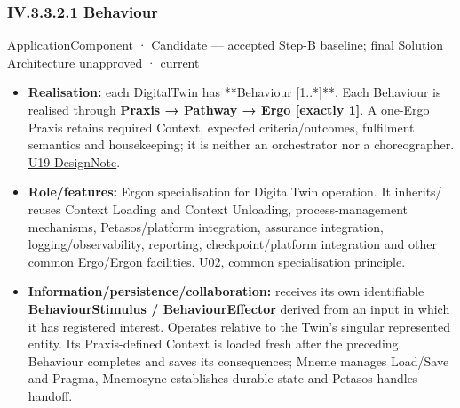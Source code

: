 \subsubsection*{IV.3.3.2.1 Behaviour}
\label{navigation:IV.3.3.2.1}

\label{element:a26f06d66bec4981b266e202c46a9afb}
{\small ApplicationComponent · Candidate — accepted Step-B baseline; final Solution Architecture unapproved · current}\par

\begin{itemize}


\item \textbf{Realisation:} each DigitalTwin has **Behaviour [1..*]**. Each Behaviour is
  realised through \textbf{Praxis → Pathway → Ergo [exactly 1]}. A one-Ergo Praxis
  retains required Context, expected criteria/outcomes, fulfilment semantics and
  housekeeping; it is neither an orchestrator nor a choreographer.
  \href{\detokenize{../../../../../docs/markdown/05-information-systems-architecture/design-notes/DesignNote-Digital-Twin-Behaviour-and-Execution-Semantics.md}}{U19 DesignNote}.

\item \textbf{Role/features:} Ergon specialisation for DigitalTwin operation. It inherits/
  reuses Context Loading and Context Unloading, process-management mechanisms,
  Petasos/platform integration, assurance integration, logging/observability,
  reporting, checkpoint/platform integration and other common Ergo/Ergon facilities.
  \href{\detokenize{../../../../../docs/markdown/05-information-systems-architecture/sources.md#u02}}{U02}, \href{\detokenize{../../../../../docs/markdown/05-information-systems-architecture/README.md#specialisation-principle}}{common specialisation principle}.

\item \textbf{Information/persistence/collaboration:} receives its own identifiable
  \textbf{BehaviourStimulus / BehaviourEffector} derived from an input in which it has
  registered interest. Operates relative to the Twin's singular represented
  entity. Its Praxis-defined Context is loaded fresh after the preceding
  Behaviour completes and saves its consequences; Mneme manages Load/Save and
  Pragma, Mnemosyne establishes durable state and Petasos handles handoff.


\end{itemize}
